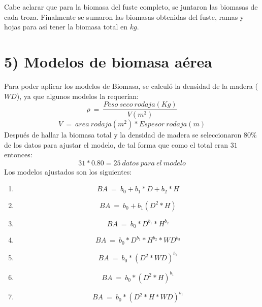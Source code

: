 \documentclass[9pt,onecolumn,twoside,]{pinp}
\providecommand{\tightlist}{%
  \setlength{\itemsep}{0pt}\setlength{\parskip}{0pt}}
\begin{document}
Cabe aclarar que para la biomasa del fuste completo, se juntaron las
biomasas de cada troza. Finalmente se sumaron las biomasas obtenidas del
fuste, ramas y hojas para así tener la biomasa total en \(kg\).

\hypertarget{modelos-de-biomasa-aérea}{%
\section{5) Modelos de biomasa
aérea}\label{modelos-de-biomasa-aérea}}

Para poder aplicar los modelos de Biomasa, se calculó la densidad de la
madera (\(WD\)), ya que algunos modelos la requerían:
\[\rho \ = \  \frac{Peso \ seco \ rodaja (Kg)}{ V(m^3)}\]
\[V \ = \ area \ rodaja (m^2) * Espesor \ rodaja (m)\] Después de hallar la
biomasa total y la densidad de madera se seleccionaron 80\% de los datos
para ajustar el modelo, de tal forma que como el total eran \(31\)
entonces: \[31*0.80= 25 \ datos \ para \ el \ modelo\] Los modelos
ajustados son los siguientes:

\begin{enumerate}
\def\labelenumi{\alph{enumi})}
\tightlist
\item
  \[BA \ = \ b_0 + b_1*D+b_2*H\]
\item
  \[BA \ = \ b_0+b_1(D^2*H)\]
\item
  \[BA \ = \ b_0*D^{b_1}*H^{b_2}\]
\item
  \[BA \ = \ b_0*D^{b_1}*H^{b_2}*WD^{b_3}\]
\item
  \[BA \ = \ b_0*(D^2*WD)^{b_1}\]
\item
  \[BA \ = \ b_0*(D^2*H)^{b_1}\]
\item
  \[BA \ = \ b_0*(D^2*H*WD)^{b_1}\]
\end{enumerate}
\end{document}
